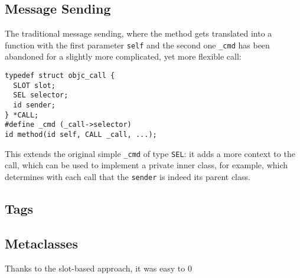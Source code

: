 \subsection{Message Sending}

The traditional message sending, where the method gets translated into a function with the first parameter \verb=self= and the second one \verb=_cmd= has been abandoned for a slightly more complicated, yet more flexible call:

\begin{verbatim}
typedef struct objc_call {
  SLOT slot;
  SEL selector;
  id sender;
} *CALL;
#define _cmd (_call->selector)
id method(id self, CALL _call, ...);
\end{verbatim}

This extends the original simple \verb=_cmd= of type \verb=SEL=: it adds a more context to the call, which can be used to implement a private inner class, for example, which determines with each call that the \verb=sender= is indeed its parent class.

\subsection{Tags}

\subsection{Metaclasses}

Thanks to the slot-based approach, it was easy to 0